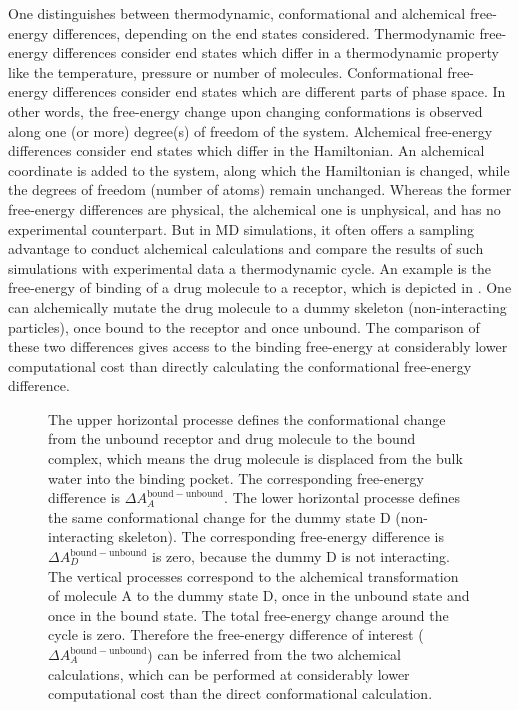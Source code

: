 One distinguishes between thermodynamic, conformational and alchemical free-energy differences, depending on the end states considered.
%
Thermodynamic free-energy differences consider end states which differ in a thermodynamic property like the temperature, pressure or number of molecules.
%
Conformational free-energy differences consider end states which are different parts
of phase space. In other words, the free-energy change upon changing conformations is observed 
along one (or more) degree(s) of freedom of the system.
%
Alchemical free-energy differences consider end states which differ in the Hamiltonian. An alchemical coordinate is added to the system, along which the Hamiltonian is changed, while the degrees of freedom (number of atoms) remain unchanged. Whereas the former free-energy differences are physical, the alchemical one is unphysical, and has no experimental counterpart.
%
But in MD simulations, it often offers a sampling advantage to conduct alchemical calculations and compare the results of such simulations with experimental data \via{} a thermodynamic cycle.
%
An example is the free-energy of binding of a drug molecule to a receptor, which is depicted in . One can alchemically mutate the drug molecule to a dummy skeleton (non-interacting particles), once bound to the receptor and once unbound. 
%
The comparison of these 
two differences  gives access to the  binding free-energy 
at considerably lower computational cost than directly calculating the conformational free-energy difference.


\begin{figure}[!htb]
\caption{\footnotesize{}
The upper horizontal processe defines the conformational change from the unbound receptor and drug molecule to the bound complex, which means the drug molecule is displaced from the bulk water into the binding pocket. The corresponding free-energy difference is $\Delta A_{A}^{\mathrm{bound-unbound}}$.
The lower horizontal processe defines the same conformational change for the dummy state D (non-interacting skeleton). The corresponding free-energy difference is $\Delta A_{D}^{\mathrm{bound-unbound}}$ is zero, because the dummy D is not interacting.
The vertical processes correspond to the alchemical transformation of molecule A to the dummy state D, once in the unbound state and once in the bound state. The total free-energy change around the cycle is zero. Therefore the free-energy difference of interest ($\Delta A_{A}^{\mathrm{bound-unbound}}$) can be inferred from the two alchemical calculations, which can be performed at considerably lower computational cost than the direct conformational calculation.
}
\label{fig:cycle}
\end{figure}

